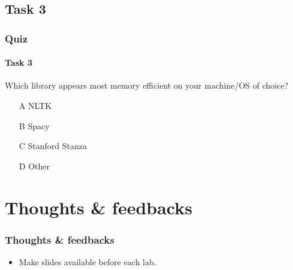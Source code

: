 \documentclass{beamer}
\begin{document}
\subsection{Task 3}
\begin{frame}
    \frametitle{Quiz}
    \framesubtitle{Task 3}
    Which library appears most memory efficient on your machine/OS of choice?
    \begin{enumerate}
        \item[A] NLTK
        \item[B] Spacy
        \item[C] Stanford Stanza
        \item[D] Other
    \end{enumerate}
\end{frame}

\section{Thoughts \& feedbacks}
\begin{frame}
    \frametitle{Thoughts \& feedbacks}
    \begin{itemize}
        \item Make slides available before each lab. 
    \end{itemize}
\end{frame}
\end{document}
